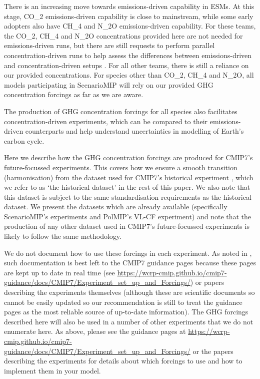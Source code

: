 There is an increasing move towards emissions-driven capability in ESMs.
At this stage, CO_2 emissions-driven capability is close to mainstream,
while some early adopters also have CH_4 and N_2O emissions-driven capability.
For these teams, the CO_2, CH_4 and N_2O concentrations provided here are not needed for emissions-driven runs,
but there are still requests to perform parallel concentration-driven runs
to help assess the differences between emissions-driven and concentration-driven setups \citep{van-vuuren_scenariomip_2026}.
For all other teams, there is still a reliance on our provided concentrations.
For species other than CO_2, CH_4 and N_2O, all models participating in ScenarioMIP
will rely on our provided GHG concentration forcings as far as we are aware.

The production of GHG concentration forcings for all species also facilitates concentration-driven experiments,
which can be compared to their emissions-driven counterparts and help understand uncertainties in modelling of Earth's carbon cycle.

Here we describe how the GHG concentration forcings are produced for CMIP7's future-focussed experiments.
This covers how we ensure a smooth transition (harmonisation)
from the dataset used for CMIP7's historical experiment \citep{nicholls_historical-ghgs_2026},
which we refer to as `the historical dataset' in the rest of this paper.
We also note that this dataset is subject to the same standardisation requirements
as the historical dataset.
We present the datasets which are already available (specifically ScenarioMIP's experiments and PolMIP's VL-CF experiment)
and note that the production of any other dataset used in CMIP7's future-focussed experiments is likely to follow the same methodology.

We do not document how to use these forcings in each experiment.
As noted in \citet{nicholls_historical-ghgs_2026}, such documentation is best left to the CMIP7 guidance pages
because these pages are kept up to date in real time
(see \newline \mbox{\url{https://wcrp-cmip.github.io/cmip7-guidance/docs/CMIP7/Experiment_set_up_and_Forcings/}})
or papers describing the experiments themselves
(although these are scientific documents so cannot be easily updated
so our recommendation is still to treat the guidance pages as the most reliable source of up-to-date information).
The GHG forcings described here will also be used in a number of other experiments that we do not enumerate here.
As above, please see the guidance pages at
\newline \mbox{\url{https://wcrp-cmip.github.io/cmip7-guidance/docs/CMIP7/Experiment_set_up_and_Forcings/}}
or the papers describing the experiments for details about which forcings to use
and how to implement them in your model.

